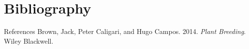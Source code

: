 \documentclass[11pt,dvipsnames,ignorenonframetext,aspectratio=169]{beamer}
\newlength{\cslhangindent}
\newenvironment{CSLReferences}%
  {\setlength{\parindent}{0pt}%
  \everypar{\setlength{\hangindent}{\cslhangindent}}\ignorespaces}%
  {\par}
\begin{document}
\hypertarget{bibliography}{%
\section{Bibliography}\label{bibliography}}

\begin{frame}{References}
\protect\hypertarget{references}{}
\hypertarget{refs}{}
\begin{CSLReferences}{1}{0}
\leavevmode{}%
Brown, Jack, Peter Caligari, and Hugo Campos. 2014. \emph{Plant
Breeding}. Wiley Blackwell.

\end{CSLReferences}
\end{frame}
\end{document}

